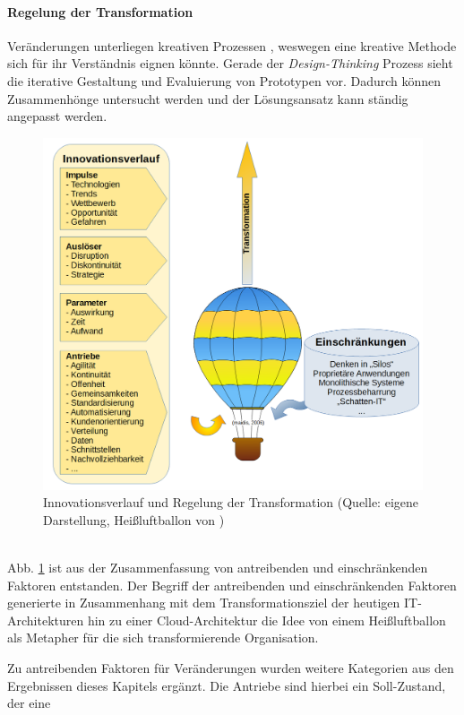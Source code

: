 \paragraph{Regelung der Transformation}
Veränderungen unterliegen kreativen Prozessen \cite[S.14]{Alt2017}, weswegen eine kreative Methode sich für ihr Verständnis eignen könnte. Gerade der \emph{Design-Thinking} Prozess sieht die iterative Gestaltung und Evaluierung von Prototypen vor. Dadurch können Zusammenhönge untersucht werden und der Lösungsansatz kann ständig angepasst werden.
\medskip
\\
\begin{figure}[htbp]
 \centering
 \includegraphics[width=1.0\textwidth]{gfx/digital-transformation-lifecycle-by-selim3.PNG}
 \caption{Innovationsverlauf und Regelung der Transformation (Quelle: eigene Darstellung, Heißluftballon von \citet{maidis_2006})\label{fig:digit-trans}
 }
\end{figure}
\medskip
\\
Abb. \ref{fig:digit-trans} ist aus der Zusammenfassung von antreibenden und einschränkenden Faktoren entstanden. Der Begriff der antreibenden und einschränkenden Faktoren generierte in Zusammenhang mit dem Transformationsziel der heutigen IT-Architekturen hin zu einer Cloud-Architektur die Idee von einem Heißluftballon als Metapher für die sich transformierende Organisation.

Zu antreibenden Faktoren für Veränderungen wurden weitere Kategorien aus den Ergebnissen dieses Kapitels ergänzt. Die Antriebe sind hierbei ein Soll-Zustand, der eine 

